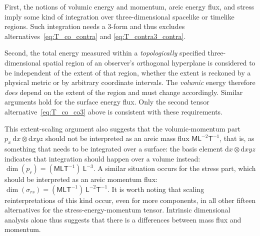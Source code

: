 \documentclass[\ifafour a4paper,12pt,\else a5paper,10pt,\fi%
onecolumn,oneside,article,%
british%
]{memoir}
\theoremstyle{remark}
\theoremstyle{innote}
\newcommand*{\citep}{\footcites}
\newcommand*{\di}{\mathrm{d}}%
\renewcommand*{\|}[1][]{\nonscript\,#1\vert\nonscript\;\mathopen{}}
\newcommand*{\sect}{\S}%
\newcommand*{\cf}{{cf.}}
\newcommand*{\Le}{\textsf{L}}
\newcommand*{\Ti}{\textsf{T}}
\newcommand*{\Ma}{\textsf{M}}
\newcommand*{\En}{\Epsilon}%
\newcommand*{\yp}{p}
\newcommand*{\yt}{\sigma}
\newcommand*{\dixyz}{\di xyz}
\begin{document}
First, the notions of volumic energy and momentum, areic energy flux, and
stress imply some kind of integration over three-dimensional spacelike or
timelike regions. Such integration needs a 3-form and thus excludes
alternatives~\eqref{eq:T_co_contra} and \eqref{eq:T_contra3_contra}.

Second, the total energy measured within a \emph{topologically} specified
three-dimensional spatial region of an observer's orthogonal hyperplane is
considered to be independent of the extent of that region, whether the
extent is reckoned by a physical metric or by arbitrary coordinate
intervals. %
The \emph{volumic} energy therefore \emph{does} depend on the extent of the
region and must change accordingly. Similar arguments hold for the surface
energy flux. Only the second tensor alternative~\eqref{eq:T_co_co3} above
is consistent with these requirements.

This extent-scaling argument also suggests that the volumic-momentum part
$\yp_{x}\ \di x\otimes\dixyz$ should not be interpreted as an areic mass
flux $\Ma\Le^{-2}\Ti^{-1}$, that is, as something that needs to be
integrated over a surface: the basis element $\di x\otimes\dixyz$ indicates
that integration should happen over a volume instead: %
$\dim(\yp_{r}) = (\Ma\Le\Ti^{-1})\ \Le^{-3}$.
A similar situation occurs for the stress part, which should be interpreted
as an areic momentum flux:
$\dim(\yt_{rs}) = (\Ma\Le\Ti^{-1})\ \Le^{-2}\Ti^{-1}$. It is worth noting
that scaling reinterpretations of this kind occur, even for more
components, in all other fifteen alternatives for the
stress-energy-momentum tensor. Intrinsic dimensional analysis alone thus
suggests that there is a differences between mass flux and
momentum.%
\end{document}
